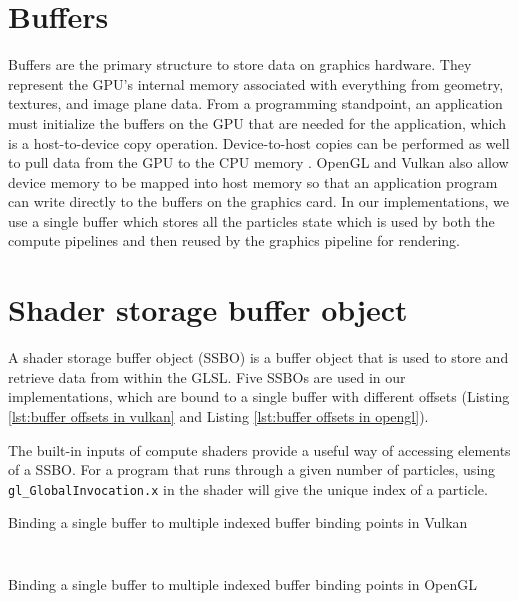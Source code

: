 \documentclass[a4paper, 12pt, oneside]{book}
\newenvironment{longlisting}{\captionsetup{type=listing}}{}
\begin{document}
\section{Buffers}
\begin{doublespace}
    Buffers are the primary structure to store data on graphics hardware. They represent the GPU's internal memory associated with everything from geometry, textures, and image plane data. From a programming standpoint, an application must initialize the buffers on the GPU that are needed for the application, which is a host-to-device copy operation. Device-to-host copies can be performed as well to pull data from the GPU to the CPU memory \cite[442]{marschner2016}. OpenGL and Vulkan also allow device memory to be mapped into host memory so that an application program can write directly to the buffers on the graphics card. In our implementations, we use a single buffer which stores all the particles state which is used by both the compute pipelines and then reused by the graphics pipeline for rendering.
\end{doublespace}

\section{Shader storage buffer object}

\begin{doublespace}
    A shader storage buffer object (SSBO) is a buffer object that is used to store and retrieve data from within the GLSL. Five SSBOs are used in our implementations, which are bound to a single buffer with different offsets (Listing \ref{lst:buffer offsets in vulkan} and Listing \ref{lst:buffer offsets in opengl}). 
    
    The built-in inputs of compute shaders provide a useful way of accessing elements of a SSBO. For a program that runs through a given number of particles, using \texttt{gl_GlobalInvocation.x} in the shader will give the unique index of a particle.

\end{doublespace}
\begin{longlisting}
\caption{Binding a single buffer to multiple indexed buffer binding points in Vulkan}
\label{lst:buffer offsets in vulkan}
\inputminted[firstline=195, lastline=208]{c++}{code/vulkan.hpp}
\inputminted[firstline=1043, lastline=1070]{c++}{code/vulkan.cpp}
\end{longlisting}

\begin{longlisting}
\caption{Binding a single buffer to multiple indexed buffer binding points in OpenGL}
\label{lst:buffer offsets in opengl}
\inputminted[firstline=249, lastline=262]{c++}{code/opengl.cpp}
\inputminted[firstline=316, lastline=321]{c++}{code/opengl.cpp}
\end{longlisting}
\end{document}
